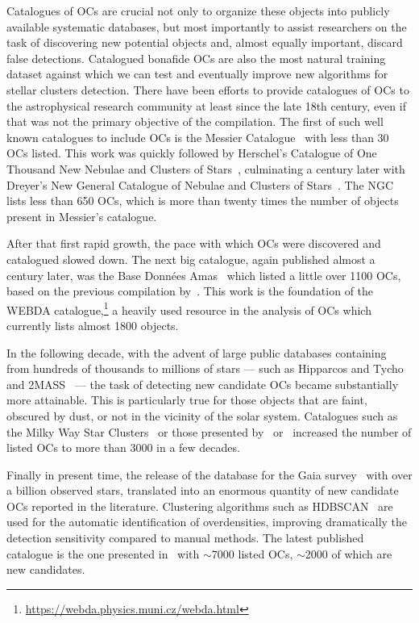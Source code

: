 \documentclass[fleqn,usenatbib]{mnras}
\begin{document}
Catalogues of OCs are crucial not only to organize these objects into publicly
available systematic databases, but most importantly to assist researchers on the
task of discovering new potential objects and, almost equally important,
discard false detections.
Catalogued bonafide OCs are also the most natural training dataset against which
we can test and eventually improve new algorithms for stellar clusters
detection.
%
There have been efforts to provide catalogues of OCs to the astrophysical
research community at least since the late 18th century, even if that was not
the primary objective of the compilation. The first of such well known
catalogues to include OCs is the Messier Catalogue~\citep{Messier1771} with
less than 30 OCs listed. This work was quickly followed by Herschel's
Catalogue of One Thousand New Nebulae and Clusters of
Stars~\citep{Herschel1786}, culminating a century later with Dreyer's New
General Catalogue of Nebulae and Clusters of Stars~\citep[NGC,][]{Dreyer1888}.
The NGC lists less than 650 OCs, which is more than twenty times the number of
objects present in Messier's catalogue.

After that first rapid growth, the pace with which OCs were discovered and
catalogued slowed down. The next big catalogue, again published almost a
century later, was the Base Données Amas~\citep{Mermilliod1995} which
listed a little over 1100 OCs, based on the previous compilation
by~\cite{Lynga1987}. This work is the foundation of the WEBDA
catalogue,\footnote{\url{https://webda.physics.muni.cz/webda.html}} a heavily
used resource in the analysis of OCs which currently lists almost 1800 objects.

In the following decade, with the advent of large public databases containing
from hundreds of thousands to millions of stars --- such as Hipparcos and
Tycho~\citep{Perryman_1997,Hog_1997} and 2MASS~\citep{Skrutskie_2006} --- the
task of detecting new candidate OCs became substantially more attainable. This
is particularly true for those objects that are faint, obscured by dust, or not
in the vicinity of the solar system. Catalogues such as the Milky Way Star
Clusters~\citep{Kharchenko_2012} or those presented
by~\cite{Loktin_2017} or~\cite{Bica_2019} increased the number of listed OCs to
more than 3000 in a few decades.

Finally in present time, the release of the database for the Gaia
survey~\citep{Gaia_2016} with over a billion observed stars, translated into an
enormous quantity of new candidate OCs reported in the literature. Clustering
algorithms such as HDBSCAN~\citep{Campello_2013} are used for the automatic
identification of overdensities, improving dramatically the detection
sensitivity compared to manual methods.
The latest published catalogue is the one presented in~\cite{Hunt_2023}
with $\sim$7000 listed OCs, $\sim$2000 of which are new candidates.
\end{document}
